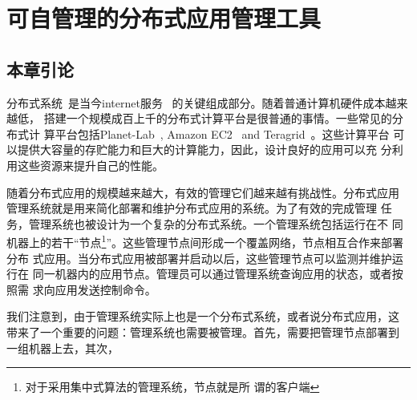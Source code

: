 \chapter{可自管理的分布式应用管理工具}
\label{chap:selfman}


%
%
%
%
%
%
%
%
%
%
%
%

\section{本章引论}

分布式系统~\cite{Ghemawat2003,DeCandia2007}是当今internet服务~
\cite{google, amazon?}的关键组成部分。随着普通计算机硬件成本越来越低，
搭建一个规模成百上千的分布式计算平台是很普通的事情。一些常见的分布式计
算平台包括Planet-Lab~\cite{Bavier2004}, Amazon
EC2~\cite{Garfinkel2007} and Teragrid~\cite{Catlett2002}。这些计算平台
可以提供大容量的存贮能力和巨大的计算能力，因此，设计良好的应用可以充
分利用这些资源来提升自己的性能。

随着分布式应用的规模越来越大，有效的管理它们越来越有挑战性。分布式应用
管理系统就是用来简化部署和维护分布式应用的系统。为了有效的完成管理
任务，管理系统也被设计为一个复杂的分布式系统。一个管理系统包括运行在不
同机器上的若干“节点\footnote{对于采用集中式算法的管理系统，节点就是所
谓的客户端}”。这些管理节点间形成一个覆盖网络，节点相互合作来部署分布
式应用。当分布式应用被部署并启动以后，这些管理节点可以监测并维护运行在
同一机器内的应用节点。管理员可以通过管理系统查询应用的状态，或者按照需
求向应用发送控制命令。

我们注意到，由于管理系统实际上也是一个分布式系统，或者说分布式应用，这
带来了一个重要的问题：管理系统也需要被管理。首先，需要把管理节点部署到
一组机器上去，其次，

